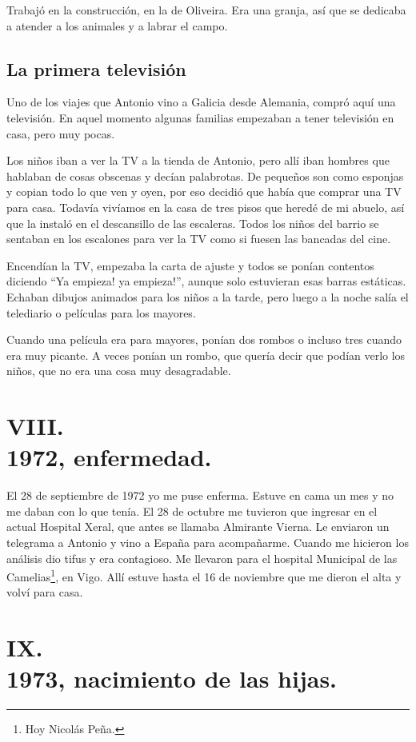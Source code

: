 \documentclass[12pt,a5paper]{book}
\begin{document}
Trabajó en la construcción, en la de Oliveira. Era una granja, así que se dedicaba a atender a los animales y a labrar el campo.


\subsection*{La primera televisión}

Uno de los viajes que Antonio vino a Galicia desde Alemania, compró aquí una televisión. En aquel momento algunas familias empezaban a tener televisión en casa, pero muy pocas.

Los niños iban a ver la TV a la tienda de Antonio, pero allí iban hombres que hablaban de cosas obscenas y decían palabrotas. De pequeños son como esponjas y copian todo lo que ven y oyen, por eso decidió que había que comprar una TV para casa. Todavía vivíamos en la casa de tres pisos que heredé de mi abuelo, así que la instaló en el descansillo de las escaleras. Todos los niños del barrio se sentaban en los escalones para ver la TV como si fuesen las bancadas del cine.

Encendían la TV, empezaba la carta de ajuste y todos se ponían contentos diciendo ``Ya empieza! ya empieza!'', aunque solo estuvieran esas barras estáticas. Echaban dibujos animados para los niños a la tarde, pero luego a la noche salía el telediario o películas para los mayores.

Cuando una película era para mayores, ponían dos rombos o incluso tres cuando era muy picante. A veces ponían un rombo, que quería decir que podían verlo los niños, que no era una cosa muy desagradable.



\section*{VIII.\\1972, enfermedad.}

El 28 de septiembre de 1972 yo me puse enferma. Estuve en cama un mes y no me daban con lo que tenía. El 28 de octubre me tuvieron que ingresar en el actual Hospital Xeral, que antes se llamaba Almirante Vierna. Le enviaron un telegrama a Antonio y vino a España para acompañarme. Cuando me hicieron los análisis dio tifus y era contagioso. Me llevaron para el hospital Municipal de las Camelias\footnote{Hoy Nicolás Peña.}, en Vigo. Allí estuve hasta el 16 de noviembre que me dieron el alta y volví para casa.


\section*{IX.\\1973, nacimiento de las hijas.}
\end{document}

